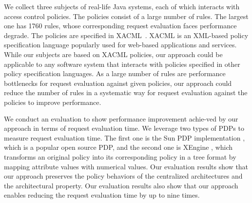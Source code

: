



We collect three subjects of real-life Java systems, each of which interacts
with access control policies. The policies consist of a large number of rules. The largest one has 1760 rules, whose corresponding request evaluation faces performance degrade.
The policies are specified in XACML~\cite{sunxacml}.
XACML is an XML-based policy specification language popularly used for web-based applications and services.
While our subjects are based on XACML policies,
our approach could be
applicable to any software system that interacts with policies specified in other
policy specification languages. As a large number of rules are performance bottlenecks for request evaluation
against given policies, our approach could reduce the number of rules in a systematic way for request evaluation against the policies to improve performance.



We conduct an evaluation to show performance improvement achie-ved by our approach in terms of request evaluation time.
We leverage two types of PDPs to measure request evaluation time. The first one is the
Sun PDP implementation \cite{oasis}, which is a popular open source PDP, and the second one is XEngine \cite{Xengine}, which transforms an original policy
into its corresponding policy in a tree format by mapping attribute values with numerical values.
Our evaluation results show that our approach
preserves the policy behaviors of the centralized architectures and the architectural property. Our evaluation results also show that our approach
enables reducing the request evaluation time by up to nine times.



